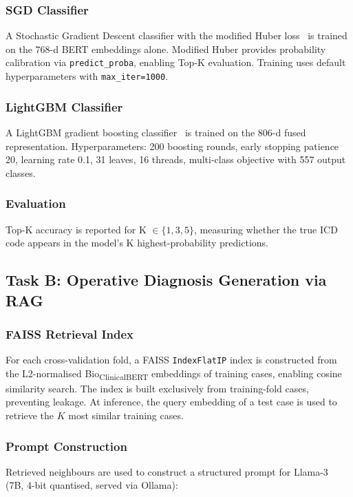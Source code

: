 \documentclass[10pt,twocolumn]{article}
\begin{document}
\subsubsection{SGD Classifier}
A Stochastic Gradient Descent classifier with the modified Huber loss~\cite{zhang2004solving} is trained on the 768-d BERT embeddings alone. Modified Huber provides probability calibration via \texttt{predict\_proba}, enabling Top-K evaluation. Training uses default hyperparameters with \texttt{max\_iter=1000}.

\subsubsection{LightGBM Classifier}
A LightGBM gradient boosting classifier~\cite{ke2017lightgbm} is trained on the 806-d fused representation. Hyperparameters: 200 boosting rounds, early stopping patience 20, learning rate 0.1, 31 leaves, 16 threads, multi-class objective with 557 output classes.

\subsubsection{Evaluation}
Top-K accuracy is reported for K $\in \{1, 3, 5\}$, measuring whether the true ICD code appears in the model's K highest-probability predictions.

\subsection{Task B: Operative Diagnosis Generation via RAG}
\label{sec:taskb}

\subsubsection{FAISS Retrieval Index}
For each cross-validation fold, a FAISS \texttt{IndexFlatIP} index is constructed from the L2-normalised Bio\textsubscript{ClinicalBERT} embeddings of training cases, enabling cosine similarity search. The index is built exclusively from training-fold cases, preventing leakage. At inference, the query embedding of a test case is used to retrieve the $K$ most similar training cases.

\subsubsection{Prompt Construction}
Retrieved neighbours are used to construct a structured prompt for Llama-3~\cite{touvron2023llama} (7B, 4-bit quantised, served via Ollama):
\end{document}
